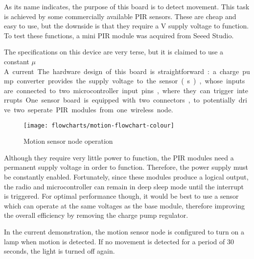 As its name indicates, the purpose of this board is to detect movement. This
task is achieved by some commercially available PIR sensors. These are cheap and
easy to use, but the downside is that they require a \unit[5]{V} supply voltage
to function. To test these functions, a mini PIR module was acquired from Seeed
Studio.

The specifications on this device are very terse, but it is claimed to use a
constant \unit[50]{$\mu$A} current.

The hardware design of this board is straightforward : a charge pump converter
provides the supply voltage to the sensor(s), whose inputs are connected to two
microcontroller input pins, where they can trigger interrupts. One sensor board
is equipped with two connectors, to potentially drive two seperate PIR modules
from one wireless node.


\begin{figure}[H]
  \begin{center}
    \texttt{[image: flowcharts/motion-flowchart-colour]}
  \end{center}
  \caption{Motion sensor node operation}
  \label{fig:motion-flowchart}
\end{figure}

Although they require very little power to function, the PIR modules need a
permanent supply voltage in order to function. Therefore, the power supply must
be constantly enabled. Fortunately, since these modules produce a logical
output, the radio and microcontroller can remain in deep sleep mode until the
interrupt is triggered. For optimal performance though, it would be best to use
a sensor which can operate at the same voltages as the base module, therefore
improving the overall efficiency by removing the charge pump regulator.


In the current demonstration, the motion sensor node is configured to turn on a
lamp when motion is detected. If no movement is detected for a period of 30
seconds, the light is turned off again.


